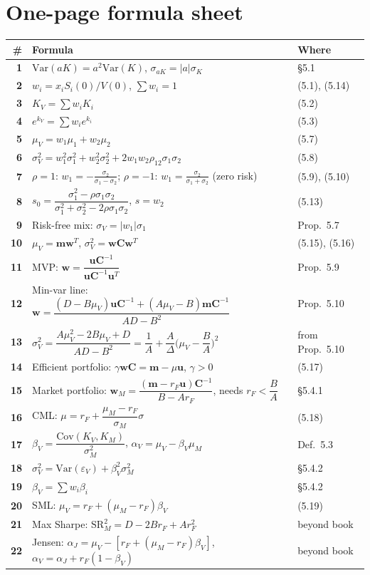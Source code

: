 \documentclass[titlepage,11pt,a4paper]{article}
\newcommand{\Var}{\mathrm{Var}}
\newcommand{\Cov}{\mathrm{Cov}}
\newcommand{\vw}{\boldsymbol{w}}
\newcommand{\vm}{\boldsymbol{m}}
\newcommand{\vu}{\boldsymbol{u}}
\newcommand{\vC}{\boldsymbol{C}}
\newcommand{\T}{^{T}}
\newcommand{\Ci}{\vC^{-1}}
\newcommand{\SR}{\mathrm{SR}}
\begin{document}
\section{One-page formula sheet}

\begin{center}\small\renewcommand{\arraystretch}{1.5}
\begin{tabular}{@{}>{\color{mymagenta}\bfseries}r >{\raggedright\arraybackslash}p{} >{\raggedleft\arraybackslash}p{}@{}}
\toprule
\textbf{\color{mycyan}\#} & \textbf{\color{mycyan}Formula} & \textbf{\color{mycyan}Where}\\
\midrule
1 & $\Var(aK)=a^2\Var(K)$, $\sigma_{aK}=\lvert a\rvert\sigma_K$ & \S5.1\\
2 & $w_i=x_iS_i(0)/V(0)$, $\sum w_i=1$ & (5.1), (5.14)\\
3 & $K_V=\sum w_iK_i$ & (5.2)\\
4 & $e^{k_V}=\sum w_ie^{k_i}$ & (5.3)\\
5 & $\mu_V=w_1\mu_1+w_2\mu_2$ & (5.7)\\
6 & $\sigma_V^2=w_1^2\sigma_1^2+w_2^2\sigma_2^2+2w_1w_2\rho_{12}\sigma_1\sigma_2$ & (5.8)\\
7 & $\rho=1$: $w_1=-\frac{\sigma_2}{\sigma_1-\sigma_2}$; $\rho=-1$: $w_1=\frac{\sigma_2}{\sigma_1+\sigma_2}$ (zero risk) & (5.9), (5.10)\\
8 & $s_0=\dfrac{\sigma_1^2-\rho\sigma_1\sigma_2}{\sigma_1^2+\sigma_2^2-2\rho\sigma_1\sigma_2}$, $s=w_2$ & (5.13)\\
9 & Risk-free mix: $\sigma_V=\lvert w_1\rvert\sigma_1$ & Prop.\ 5.7\\
10 & $\mu_V=\vm\vw\T$, $\sigma_V^2=\vw\vC\vw\T$ & (5.15), (5.16)\\
11 & MVP: $\vw=\dfrac{\vu\Ci}{\vu\Ci\vu\T}$ & Prop.\ 5.9\\
12 & Min-var line: $\vw=\dfrac{(D-B\mu_V)\vu\Ci+(A\mu_V-B)\vm\Ci}{AD-B^2}$ & Prop.\ 5.10\\
13 & $\sigma_V^2=\dfrac{A\mu_V^2-2B\mu_V+D}{AD-B^2}=\dfrac1A+\dfrac{A}{\Delta}\Big(\mu_V-\dfrac BA\Big)^2$ & from Prop.\ 5.10\\
14 & Efficient portfolio: $\gamma\vw\vC=\vm-\mu\vu$, $\gamma>0$ & (5.17)\\
15 & Market portfolio: $\vw_M=\dfrac{(\vm-r_F\vu)\Ci}{B-Ar_F}$, needs $r_F<\dfrac BA$ & \S5.4.1\\
16 & CML: $\mu=r_F+\dfrac{\mu_M-r_F}{\sigma_M}\sigma$ & (5.18)\\
17 & $\beta_V=\dfrac{\Cov(K_V,K_M)}{\sigma_M^2}$, $\alpha_V=\mu_V-\beta_V\mu_M$ & Def.\ 5.3\\
18 & $\sigma_V^2=\Var(\varepsilon_V)+\beta_V^2\sigma_M^2$ & \S5.4.2\\
19 & $\beta_V=\sum w_i\beta_i$ & \S5.4.2\\
20 & SML: $\mu_V=r_F+(\mu_M-r_F)\beta_V$ & (5.19)\\
21 & Max Sharpe: $\SR_M^2=D-2Br_F+Ar_F^2$ & beyond book\\
22 & Jensen: $\alpha_J=\mu_V-[r_F+(\mu_M-r_F)\beta_V]$, $\alpha_V=\alpha_J+r_F(1-\beta_V)$ & beyond book\\
\bottomrule
\end{tabular}
\end{center}
\end{document}
